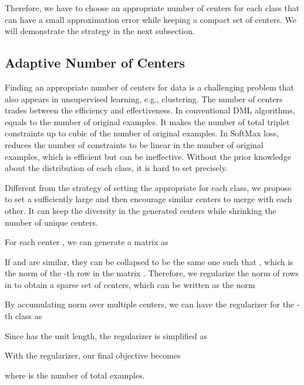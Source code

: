 \documentclass[10pt,twocolumn,letterpaper]{article}
\begin{document}
Therefore, we have to choose an appropriate number of centers for each class that can have a small approximation error while keeping a compact set of centers. We will demonstrate the strategy in the next subsection.

\subsection{Adaptive Number of Centers}

Finding an appropriate number of centers for data is a challenging problem that also appears in unsupervised learning, e.g.,  clustering. The number of centers  trades between the efficiency and effectiveness. In conventional DML algorithms,  equals to the number of original examples. It makes the number of total triplet constraints up to cubic of the number of original examples. In SoftMax loss,  reduces the number of constraints to be linear in the number of original examples, which is efficient but can be ineffective. Without the prior knowledge about the distribution of each class, it is hard to set  precisely. 

Different from the strategy of setting the appropriate  for each class, we propose to set a sufficiently large  and then encourage similar centers to merge with each other. It can keep the diversity in the generated centers while shrinking the number of unique centers.

For each center , we can generate a matrix as

If  and  are similar, they can be collapsed to be the same one such that , which is the  norm of the -th row in the matrix . Therefore, we regularize the  norm of rows in  to obtain a sparse set of centers, which can be written as the  norm


By accumulating  norm over multiple centers, we can have the regularizer for the -th class as 

Since  has the unit length, the regularizer is simplified as


With the regularizer, our final objective becomes

where  is the number of total examples.
\end{document}
